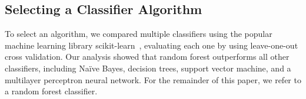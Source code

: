 \subsection{Selecting a Classifier Algorithm}

 To select an
algorithm, we compared multiple classifiers using the popular machine learning library scikit-learn~\cite{pedregosa11},  evaluating each one by using leave-one-out cross validation. Our analysis showed that random forest outperforms all other classifiers, including Na\"ive Bayes, decision trees, support vector machine, and a multilayer perceptron neural network. For the remainder of this paper, we refer to a random forest classifier.%



